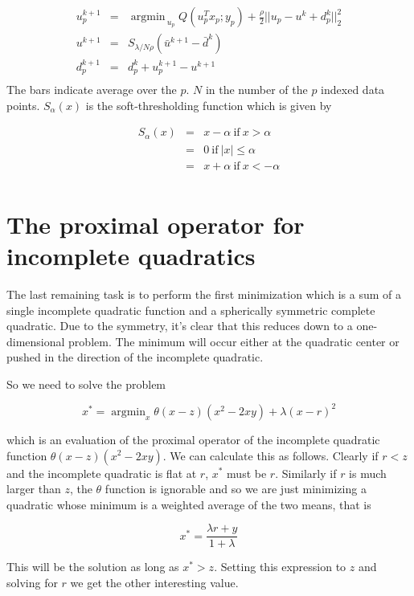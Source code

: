 \documentclass{article}
\DeclareMathOperator*{\argmin}{argmin}
\begin{document}
\begin{eqnarray}
u_p^{k+1} & = & \argmin_{~u_p} Q(u_p^T x_p; y_p) + \frac{\rho}{2} ||u_p - u^k + d_p^k||_2^2 \\
u^{k+1} & = & S_{\lambda / N \rho} (\bar{u}^{k+1} - \bar{d}^k) \\
d_p^{k+1} & = & d_p^k + u_p^{k+1} - u^{k+1} \\
\end{eqnarray}
The bars indicate average over the $p$. $N$ in the number of the $p$ indexed data points.
$S_\alpha(x)$ is the soft-thresholding function which is given by

\begin{eqnarray}
S_\alpha(x) & = & x - \alpha ~\mbox{if}~ x > \alpha \\
& = & 0 ~\mbox{if}~ |x| \le \alpha \\
& = & x + \alpha ~\mbox{if}~ x < -\alpha \\
\end{eqnarray}

\section{The proximal operator for incomplete quadratics}

The last remaining task is to perform the first minimization which is a sum of
a single incomplete quadratic function and a spherically symmetric complete quadratic.
Due to the symmetry, it's clear that this reduces down to a one-dimensional problem.
The minimum will occur either at the quadratic center or pushed in the direction of the
incomplete quadratic.

So we need to solve the problem

\[
x^* = \argmin_x \theta(x-z) (x^2 -2 x y) + \lambda (x-r)^2
\]

which is an evaluation of the proximal operator of the incomplete quadratic
function $\theta(x-z) (x^2 -2 x y)$. We can calculate this as follows. Clearly if
$r < z$ and the incomplete quadratic is flat at $r$, $x^*$ must be $r$.
Similarly if $r$ is much larger than $z$, the $\theta$ function is ignorable and
so we are just minimizing a quadratic whose minimum is a weighted average of the
two means, that is

\[
x^* = \frac{\lambda r + y}{1+\lambda}
\]

This will be the solution as long as $x^* > z$. Setting this expression to $z$
and solving for $r$ we get the other interesting value.
\end{document}
